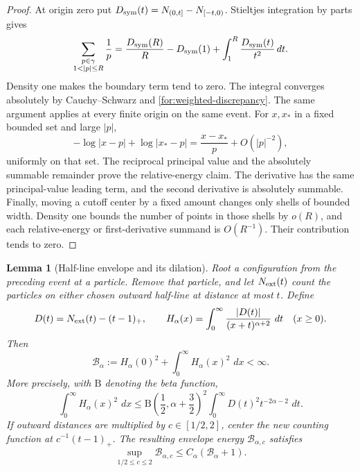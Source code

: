 \documentclass[11pt,reqno]{amsart}
\numberwithin{equation}{section}
\newtheorem{lemma}[theorem]{Lemma}
\theoremstyle{definition}
\newcommand{\1}{\mathbf 1}
\newcommand{\dd}{\,d}
\newcommand{\abs}[1]{\left|#1\right|}
\begin{document}
\begin{proof}
At origin zero put
$D_{\rm sym}(t)=N_{(0,t]}-N_{[-t,0)}$. Stieltjes integration by parts gives
\[
\sum_{\substack{p\in\gamma\\1<|p|\le R}}\frac1p
=\frac{D_{\rm sym}(R)}R-D_{\rm sym}(1)
+\int_1^R\frac{D_{\rm sym}(t)}{t^2}\dd t.
\]
Density one makes the boundary term tend to zero.
The integral converges absolutely by Cauchy--Schwarz and
\eqref{for:weighted-discrepancy}. The same argument applies at every
finite origin on the same event.
For $x,x_*$ in a fixed bounded set and large $|p|$,
\[
-\log|x-p|+\log|x_*-p|
=\frac{x-x_*}{p}+O(|p|^{-2}),
\]
uniformly on that set. The reciprocal principal value and the
absolutely summable remainder prove the relative-energy claim.
The derivative has the same principal-value leading term, and the
second derivative is absolutely summable.
Finally, moving a cutoff center by a fixed amount changes only shells
of bounded width. Density one bounds the number of points in those
shells by $o(R)$, and each relative-energy or first-derivative summand
is $O(R^{-1})$. Their contribution tends to zero.
\end{proof}

\begin{lemma}[Half-line envelope and its dilation]\label{for:halfline}
Root a configuration from the preceding event at a particle.  Remove
that particle, and let $N_{\rm ext}(t)$ count the particles on either
chosen outward half-line at distance at most $t$.  Define
\begin{equation}\label{for:envelope-def}
 D(t)=N_{\rm ext}(t)-(t-1)_+,\qquad
 H_\alpha(x)=\int_0^\infty
 \frac{\abs{D(t)}}{(x+t)^{\alpha+2}}\,\dd t\quad(x\ge0).
\end{equation}
Then
\begin{equation}\label{for:envelope-energy}
 \mathcal B_\alpha
 :=H_\alpha(0)^2+\int_0^\infty H_\alpha(x)^2\,\dd x<\infty.
\end{equation}
More precisely, with $\mathrm B$ denoting the beta function,
\begin{equation}\label{for:schur}
 \int_0^\infty H_\alpha(x)^2\,\dd x
 \le \mathrm B\left(\frac12,\alpha+\frac32\right)^2
 \int_0^\infty D(t)^2t^{-2\alpha-2}\,\dd t.
\end{equation}
If outward distances are multiplied by $c\in[1/2,2]$, center the new
counting function at $c^{-1}(t-1)_+$.  The resulting envelope energy
$\mathcal B_{\alpha,c}$ satisfies
\begin{equation}\label{for:dilation}
 \sup_{1/2\le c\le2}\mathcal B_{\alpha,c}
 \le C_\alpha(\mathcal B_\alpha+1).
\end{equation}
\end{lemma}
\end{document}
